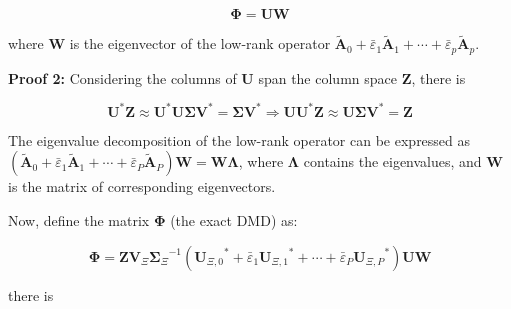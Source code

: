 \begin{equation}
    \mathbf{\Phi}=\mathbf{UW} \label{eqS11}
\end{equation}

\noindent where $\mathbf{W}$ is the eigenvector of the low-rank operator $\mathbf{\tilde{A}}_{0}+{\bar{\varepsilon}_{1}}{\mathbf{\tilde{A}}_{1}}+\cdots+{\bar{\varepsilon}_{p}}{\mathbf{\tilde{A}}_{p}}$.

\textbf{Proof 2:} Considering the columns of $\mathbf{U}$ span the column space $\mathbf{Z}$, there is~\cite{tu2013dynamic}

\begin{equation}
    {\mathbf{U}^\text{*}}\mathbf{Z}\approx {\mathbf{U}^\text{*}}\mathbf{U\Sigma}{\mathbf{V}^\text{*}}=\mathbf{\Sigma}{\mathbf{V}^\text{*}}\Rightarrow \mathbf{U}{\mathbf{U}^\text{*}}\mathbf{Z}\approx \mathbf{U\Sigma}{\mathbf{V}^\text{*}}=\mathbf{Z} \label{eqS12}
\end{equation}

The eigenvalue decomposition of the low-rank operator can be expressed as $(\mathbf{\tilde{A}}_{0}+{\bar{\varepsilon}_{1}}{\mathbf{\tilde{A}}_{1}}+\cdots+{\bar{\varepsilon}_{P}}{\mathbf{\tilde{A}}_{P}})\mathbf{W}=\mathbf{W\Lambda}$, where $\mathbf{\Lambda}$ contains the eigenvalues, and $\mathbf{W}$ is the matrix of corresponding eigenvectors. 

Now, define the matrix $\mathbf{\Phi}$ (the exact DMD) as:

\begin{equation*}
    \mathbf{\Phi}=\mathbf{Z}{\mathbf{V}_{\Xi}}{\mathbf{\Sigma}_{\Xi}}^{-1}({\mathbf{U}_{\Xi,0}}^\text{*}+{\bar{\varepsilon}_{1}}{\mathbf{U}_{\Xi,1}}^\text{*}+\cdots+{\bar{\varepsilon}_{P}}{\mathbf{U}_{\Xi,P}}^\text{*})\mathbf{UW}
\end{equation*}

\noindent there is 

